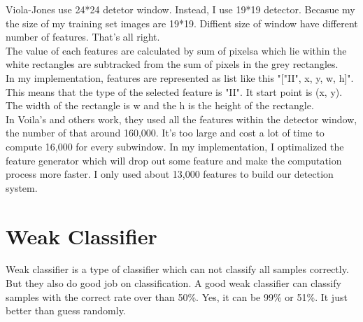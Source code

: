 \documentclass[a4paper, 11pt]{article} %
\begin{document}
    Viola-Jones use 24*24 detetor window. Instead, I use 19*19 detector. Becasue my the size of my training set images are 19*19. Diffient size of window have different number of features. That's all right.\\
    The value of each features are calculated by sum of pixelsa which lie within the white rectangles are subtracked from the sum of pixels in the grey rectangles.\\
    In my implementation, features are represented as list like this "["II", x, y, w, h]". This means that the type of the selected feature is "II". It start point is (x, y). The width of the rectangle is w and the h is the height of the rectangle.\\
    In Voila's and others work, they used all the features within the detector window, the number of that around 160,000. It's too large and cost a lot of time to compute 16,000 for every subwindow. In my implementation, I optimalized the feature generator which will drop out some feature and make the computation process more faster. I only used about 13,000 features to build our detection system.

\clearpage
\section{Weak Classifier}
Weak classifier\cite{ImprovedBoostingAlgorithmUsingConfidenceRatedPredictors} is a type of classifier which can not classify all samples correctly. But they also do good job on classification. A good weak classifier can classify samples with the correct rate over than 50\%. Yes, it can be 99\% or 51\%. It just better than guess randomly.
\end{document}
